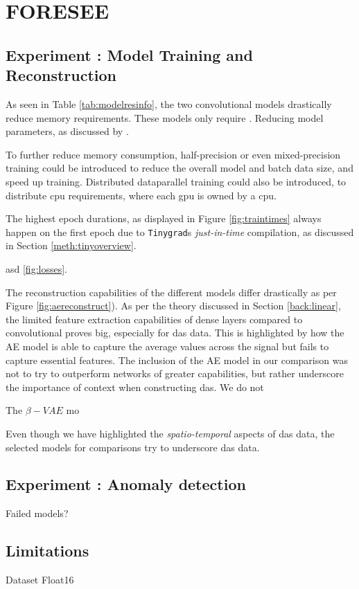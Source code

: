 \section{FORESEE}
\label{disc:foresee}

\subsection{Experiment : Model Training and Reconstruction}

As seen in Table \ref{tab:modelresinfo}, the two convolutional models drastically reduce memory requirements. These models only require . 
Reducing model parameters, as discussed by \cite{s23021009} . 

To further reduce memory consumption, half-precision or even mixed-precision training could be introduced to reduce the overall model and batch data size, and speed up training. Distributed dataparallel training could also be introduced, to distribute \acrshort{cpu} requirements, where each \acrshort{gpu} is owned by a \acrshort{cpu}.

The highest epoch durations, as displayed in Figure \ref{fig:traintimes} always happen on the first epoch due to \texttt{Tinygrad}s \textit{just-in-time} compilation, as discussed in Section \ref{meth:tinyoverview}. 


asd \ref{fig:losses}. 
      
The reconstruction capabilities of the different models differ drastically as per Figure \ref{fig:aereconstruct}). As per the theory discussed in Section \ref{back:linear}, the limited feature extraction capabilities of dense layers compared to convolutional proves big, especially for \acrshort{das} data. This is highlighted by how the AE model is able to capture the average values across the signal but fails to capture essential features. The inclusion of the AE model in our comparison was not to try to outperform networks of greater capabilities, but rather underscore the importance of context when constructing \acrshort{das}. We do not 

The $\beta-VAE$ mo

Even though we have highlighted the \textit{spatio-temporal} aspects of \acrshort{das} data, the selected models for comparisons try to underscore  \acrshort{das} data. 

\subsection{Experiment : Anomaly detection}

Failed models? 
\subsection{Limitations} 

Dataset
Float16